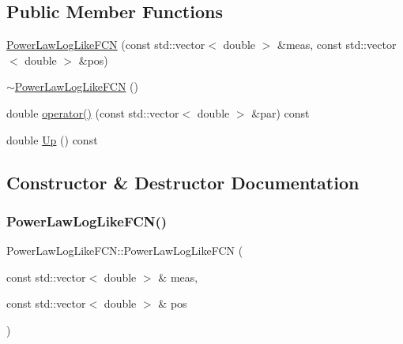 \subsection*{Public Member Functions}
\begin{DoxyCompactItemize}
\item 
\mbox{\hyperlink{classPowerLawLogLikeFCN_a160035ab7ca7016fe4e034f1cfeef32d}{Power\+Law\+Log\+Like\+F\+CN}} (const std\+::vector$<$ double $>$ \&meas, const std\+::vector$<$ double $>$ \&pos)
\item 
\mbox{\hyperlink{classPowerLawLogLikeFCN_a70fc16a153fdc6b163079c34060b317c}{$\sim$\+Power\+Law\+Log\+Like\+F\+CN}} ()
\item 
double \mbox{\hyperlink{classPowerLawLogLikeFCN_a279b7010b6b252d0772e5d561f749386}{operator()}} (const std\+::vector$<$ double $>$ \&par) const
\item 
double \mbox{\hyperlink{classPowerLawLogLikeFCN_ae1700e7288ed461d0e3354a2f2c5ea6a}{Up}} () const
\end{DoxyCompactItemize}


\subsection{Constructor \& Destructor Documentation}
\mbox{\label{classPowerLawLogLikeFCN_a160035ab7ca7016fe4e034f1cfeef32d}} 
\subsubsection{\texorpdfstring{PowerLawLogLikeFCN()}{PowerLawLogLikeFCN()}}
{\footnotesize\ttfamily Power\+Law\+Log\+Like\+F\+C\+N\+::\+Power\+Law\+Log\+Like\+F\+CN (\begin{DoxyParamCaption}\item[{const std\+::vector$<$ double $>$ \&}]{meas,  }\item[{const std\+::vector$<$ double $>$ \&}]{pos }\end{DoxyParamCaption})\hspace{0.3cm}{\ttfamily [inline]}}

\mbox{\label{classPowerLawLogLikeFCN_a70fc16a153fdc6b163079c34060b317c}} 
